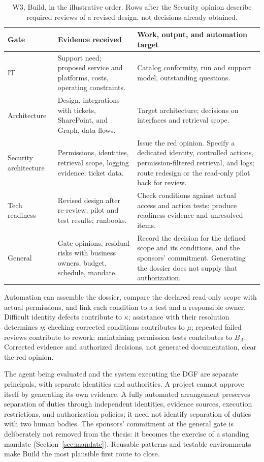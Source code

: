 \begin{table}[!htb]
\centering\small
\caption{W3, Build, in the illustrative order. Rows after the Security opinion describe required reviews
of a revised design, not decisions already obtained.}
\label{tab:w3}
\begin{tabularx}{\linewidth}{@{}P{2.7cm}LL@{}}
\toprule
Gate & Evidence received & Work, output, and automation target\\
\midrule
IT & Support need; proposed service and platforms, costs, operating constraints. & Catalog conformity,
run and support model, outstanding questions.\\
Architecture & Design, integrations with tickets, SharePoint, and Graph, data flows. & Target
architecture; decisions on interfaces and retrieval scope.\\
Security architecture & Permissions, identities, retrieval scope, logging evidence; ticket data. & Issue
the red opinion. Specify a dedicated identity, controlled actions, permission-filtered retrieval, and
logs; route redesign or the read-only pilot back for review.\\
Tech readiness & Revised design after re-review; pilot and test results; runbooks. & Check conditions
against actual access and action tests; produce readiness evidence and unresolved items.\\
General & Gate opinions, residual risks with business owners, budget, schedule, mandate. & Record the
decision for the defined scope and its conditions, and the sponsors' commitment. Generating the dossier
does not supply that authorization.\\
\bottomrule
\end{tabularx}
\end{table}

Automation can assemble the dossier, compare the declared read-only scope with actual permissions, and
link each condition to a test and a responsible owner. Difficult identity defects contribute to
$\kappa$; assistance with their resolution determines $\eta$; checking corrected conditions
contributes to $\mu$; repeated failed reviews contribute to rework; maintaining permission tests
contributes to $B_A$. Corrected evidence and authorized decisions, not generated documentation, clear
the red opinion.

The agent being evaluated and the system executing the DGF are separate principals, with separate
identities and authorities. A project cannot approve itself by generating its own evidence. A fully
automated arrangement preserves separation of duties through independent identities, evidence sources,
execution restrictions, and authorization policies; it need not identify separation of duties with two
human bodies. The sponsors' commitment at the general gate is deliberately not removed from the thesis:
it becomes the exercise of a standing mandate (Section~\ref{sec:mandate}). Reusable patterns and
testable environments make Build the most plausible first route to close.
